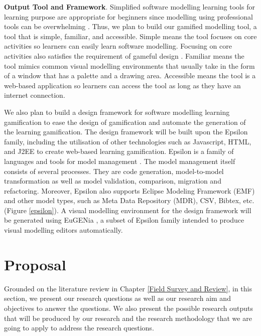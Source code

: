 \documentclass[12pt, a4paper]{report}
\begin{document}
{\textbf{Output Tool and Framework}. Simplified software modelling learning tools for learning purpose are appropriate for beginners since modelling using professional tools can be overwhelming \cite{dranidis2015learning, Akayama2013}. Thus, we plan to build our gamified modelling tool, a tool that is simple, familiar, and accessible. Simple means the tool focuses on core activities so learners can easily learn software modelling. Focusing on core activities also satisﬁes the requirement of gameful design \cite{deterding2015lens}. Familiar means the tool mimics common visual modelling environments that usually take in the form of a window that has a palette and a drawing area. Accessible means the tool is a web-based application so learners can access the tool as long as they have an internet connection.

We also plan to build a design framework for software modelling learning gamification to ease the design of gamiﬁcation and automate the generation of the learning gamification. The design framework will be built upon the Epsilon family, including the utilisation of other technologies such as Javascript, HTML, and J2EE to create web-based learning gamification. Epsilon is a family of languages and tools for model management \cite{kolovos2010epsilon}. The model management itself consists of several processes. They are code generation, model-to-model transformation as well as model validation, comparison, migration and refactoring. Moreover, Epsilon also supports Eclipse Modeling Framework (EMF) and other model types, such as Meta Data Repository (MDR), CSV, Bibtex, etc. (Figure \ref{epsilon}). A visual modelling environment for the design framework will be generated using EuGENia \cite{kolovos2015eugenia}, a subset of Epsilon family intended to produce visual modelling editors automatically.

\chapter{Proposal}
\label{Proposal}
Grounded on the literature review in Chapter \ref{Field Survey and Review}, in this section, we present our research questions as well as our research aim and objectives to answer the questions. We also present the possible research outputs that will be produced by our research and the research methodology that we are going to apply to address the research questions.   

}
\end{document}
